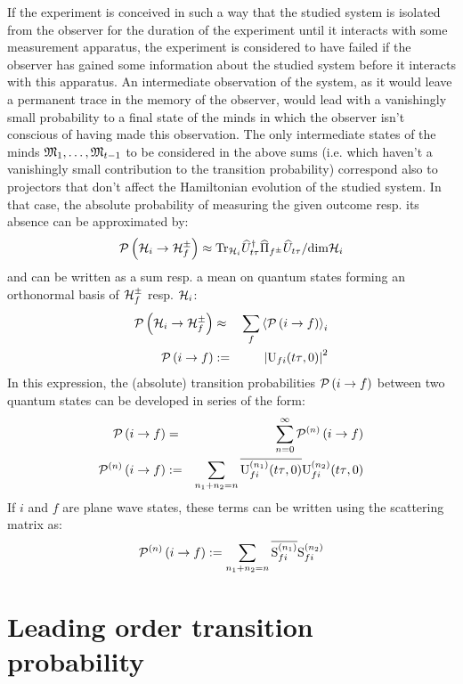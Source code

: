 \documentclass[10pt,a4paper,twoside,openany]{book}
\begin{document}
If the experiment is conceived in such a way that the studied system is isolated from the observer for the duration of the experiment until it interacts with some measurement apparatus, the experiment is considered to have failed if the observer has gained some information about the studied system before it interacts with this apparatus. An intermediate observation of the system, as it would leave a permanent trace in the memory of the observer, would lead with a vanishingly small probability to a final state of the minds in which the observer isn't conscious of having made this observation. The only intermediate states of the minds $\cms_1, \dotsc, \cms_{t - 1}$ to be considered in the above sums (i.e. which haven't a vanishingly small contribution to the transition probability) correspond also to projectors that don't affect the Hamiltonian evolution of the studied system. In that case, the absolute probability of measuring the given outcome resp. its absence can be approximated by:
\begin{equation*}
\TP{\H_i}{\H_f^\pm} \approx \mathrm{Tr}_{\H_i} \dop U_{t \tau} \op \Pi_{f^\pm} \op U_{t \tau} / \mathrm{dim} \H_i
\end{equation*}
and can be written as a sum resp. a mean on quantum states forming an orthonormal basis of $\H_f^\pm$ resp. $\H_i$:
\begin{eqnarray*}
\TP{\H_i}{\H_f^\pm} & \approx & \sum_f \left< \TP i f \right>_i \\
\TP i f & \eqdef & \left| \Um f i {t \tau}{0} \right|^2
\end{eqnarray*}
In this expression, the (absolute) transition probabilities $\TP i f$ between two quantum states can be developed in series of the form:
\begin{eqnarray*}
\TP i f & = & \sum_{n=0}^\infty \TPn i f n \\
\TPn i f n & \eqdef & \sum_{n_1 + n_2 = n} \cc{\Umn f i {n_1} {t \tau}{0}} \Umn f i {n_2} {t \tau}{0}
\end{eqnarray*}
If $i$ and $f$ are plane wave states, these terms can be written using the scattering matrix as:
\begin{equation*}
\TPn i f n \eqdef \sum_{n_1 + n_2 = n} \cc{\Smn f i {n_1}} \Smn f i {n_2}
\end{equation*}

\section{Leading order transition probability}
\end{document}
